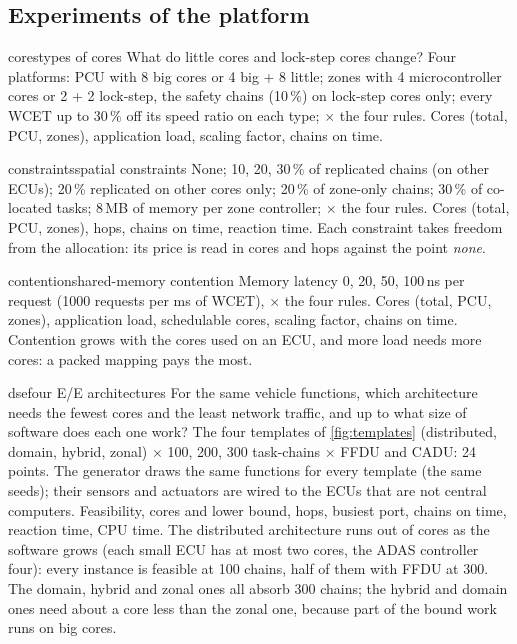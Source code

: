 \subsection{Experiments of the platform}

\begin{experimentbox}{cores}{types of cores}
 What do little cores and lock-step cores change?
 Four platforms: PCU with 8 big cores or 4 big + 8 little;
zones with 4 microcontroller cores or 2 + 2 lock-step, the safety chains
(10\,\%) on lock-step cores only; every WCET up to 30\,\% off its speed
ratio on each type; $\times$ the four rules.
 Cores (total, PCU, zones), application load, scaling
factor, chains on time.
\end{experimentbox}

\begin{experimentbox}{constraints}{spatial constraints}
 None; 10, 20, 30\,\% of replicated chains (on other
ECUs); 20\,\% replicated on other cores only; 20\,\% of zone-only chains;
30\,\% of co-located tasks; 8\,MB of memory per zone controller; $\times$
the four rules.
 Cores (total, PCU, zones), hops, chains on time,
reaction time.
 Each constraint takes freedom from the allocation: its
price is read in cores and hops against the point \emph{none}.
\end{experimentbox}

\begin{experimentbox}{contention}{shared-memory contention}
 Memory latency 0, 20, 50, 100\,ns per request (1000
requests per ms of WCET), $\times$ the four rules.
 Cores (total, PCU, zones), application load, schedulable
cores, scaling factor, chains on time.
 Contention grows with the cores used on an ECU, and more
load needs more cores: a packed mapping pays the most.
\end{experimentbox}

\begin{experimentbox}{dse}{four E/E architectures}
 For the same vehicle functions, which architecture
needs the fewest cores and the least network traffic, and up to what size
of software does each one work?
 The four templates of \cref{fig:templates}
(distributed, domain, hybrid, zonal) $\times$ 100, 200, 300 task-chains
$\times$ FFDU and CADU: 24 points. The generator draws the same functions
for every template (the same seeds); their sensors and actuators are
wired to the ECUs that are not central computers.
 Feasibility, cores and lower bound, hops, busiest port,
chains on time, reaction time, CPU time.
 The distributed architecture runs out of cores as the
software grows (each small ECU has at most two cores, the ADAS controller
four): every instance is feasible at 100 chains, half of them with FFDU
at 300. The domain, hybrid and zonal ones all absorb 300 chains; the
hybrid and domain ones need about a core less than the zonal one, because
part of the bound work runs on big cores.
\end{experimentbox}

